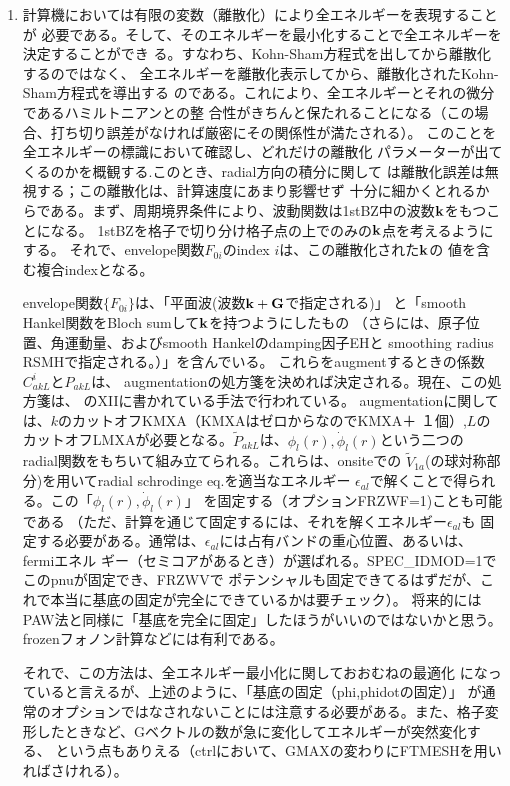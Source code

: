 \documentclass[a4paper,10pt,aip,onecolumn,amsmath,amssymb,floatfix,rmp]{revtex4-1}
\newcommand{\bfk}{{\bf k}}
\newcommand{\bfG}{{\bf G}}
\def\phidot{\dot{\phi}}
\def\tV{\tilde{V}}
\begin{document}
\begin{enumerate}
\item
計算機においては有限の変数（離散化）により全エネルギーを表現することが
必要である。そして、そのエネルギーを最小化することで全エネルギーを決定することができ
る。すなわち、Kohn-Sham方程式を出してから離散化するのではなく、
全エネルギーを離散化表示してから、離散化されたKohn-Sham方程式を導出する
のである。これにより、全エネルギーとそれの微分であるハミルトニアンとの整
合性がきちんと保たれることになる（この場合、打ち切り誤差がなければ厳密にその関係性が満たされる）。
このことを全エネルギーの標識において確認し、どれだけの離散化
パラメーターが出てくるのかを概観する.このとき、radial方向の積分に関して
は離散化誤差は無視する；この離散化は、計算速度にあまり影響せず
十分に細かくとれるからである。まず、周期境界条件により、波動関数は1stBZ中の波数$\bfk$をもつことになる。
1stBZを格子で切り分け格子点の上でのみの$\bfk$点を考えるようにする。
それで、envelope関数$F_{0i}$のindex $i$は、この離散化された$\bfk$の
値を含む複合indexとなる。

envelope関数$\{F_{0i}\}$は、「平面波(波数$\bfk+\bfG$で指定される)」
と「smooth Hankel関数をBloch sumして$\bfk$を持つようにしたもの
（さらには、原子位置、角運動量、およびsmooth Hankelのdamping因子EHと
smoothing radius RSMHで指定される。）」を含んでいる。
これらをaugmentするときの係数$C^i_{akL}$と$P_{akL}$は、
augmentationの処方箋を決めれば決定される。現在、この処方箋は、
\cite{Bott98}のXIIに書かれている手法で行われている。
augmentationに関しては、$k$のカットオフKMXA（KMXAはゼロからなのでKMXA＋
１個）,$L$のカットオフLMXAが必要となる。$\tilde{P}_{akL}$は、$\phi_l(r),\phidot_l(r)$という二つの
radial関数をもちいて組み立てられる。これらは、onsiteでの
$\tV_{1a}$(の球対称部分)を用いてradial schrodinge eq.を適当なエネルギー
$\epsilon_{al}$で解くことで得られる。この「$\phi_l(r),\phidot_l(r)$」
を固定する（オプションFRZWF=1)ことも可能である
（ただ、計算を通じて固定するには、それを解くエネルギー$\epsilon_{al}$も
固定する必要がある。通常は、$\epsilon_{al}$には占有バンドの重心位置、あるいは、fermiエネル
ギー（セミコアがあるとき）が選ばれる。SPEC\_IDMOD=1でこのpnuが固定でき、FRZWVで
ポテンシャルも固定できてるはずだが、これで本当に基底の固定が完全にできているかは要チェック）。
将来的にはPAW法と同様に「基底を完全に固定」したほうがいいのではないかと思う。
frozenフォノン計算などには有利である。

それで、この方法は、全エネルギー最小化に関しておおむねの最適化
になっていると言えるが、上述のように、「基底の固定（phi,phidotの固定）」
が通常のオプションではなされないことには注意する必要がある。また、格子変
形したときなど、Gベクトルの数が急に変化してエネルギーが突然変化する、
という点もありえる（ctrlにおいて、GMAXの変わりにFTMESHを用いればさけれる）。


\end{enumerate}
\end{document}

